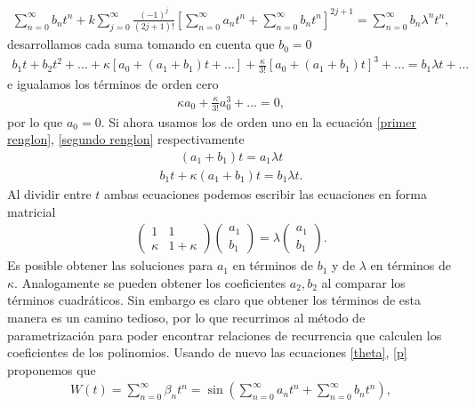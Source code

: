 \begin{eqnarray}
\sum_{n=0}^{\infty}b_{n}t^{n} +k\sum_{j=0}^{\infty}\frac{(-1)^{j}}{(2j+1)!}\left[ \sum_{n=0}^{\infty}a_{n}t^{n} +\sum_{n=0}^{\infty}b_{n}t^{n}\right]^{2j+1}=\sum_{n=0}^{\infty}b_{n}\lambda^{n}t^{n},
\label{seno exapandido 2}
\end{eqnarray}
desarrollamos cada suma tomando en cuenta que $b_{0}=0$
\begin{eqnarray}
b_{1}t+b_{2}t^{2}+...+\kappa\left[a_{0}+(a_{1}+b_{1})t+...\right]+\frac{\kappa}{3!}\left[a_{0}+(a_{1}+b_{1})t\right]^{3}+...=b_{1}\lambda t+...
\label{segundo renglon}
\end{eqnarray}
e igualamos los términos de orden cero
\begin{eqnarray}
\kappa a_{0}+\frac{\kappa}{3!}a_{0}^{3}+...=0, 
\end{eqnarray}
por lo que $a_{0}=0$. Si ahora usamos los de orden uno en la ecuación \ref{primer renglon}, \ref{segundo renglon} respectivamente
\begin{eqnarray}
(a_{1}+b_{1})t=a_{1}\lambda t
\end{eqnarray}
\begin{eqnarray}
b_{1}t+\kappa(a_{1}+b_{1})t=b_{1}\lambda t.
\end{eqnarray}
Al dividir entre $t$ ambas ecuaciones podemos escribir las ecuaciones en forma matricial
\begin{eqnarray}
\begin{pmatrix}
1 & 1\\
\kappa & 1+\kappa
\end{pmatrix}
\begin{pmatrix}
a_{1}\\
b_{1}
\end{pmatrix}=
\lambda \begin{pmatrix}
a_{1}\\
b_{1}
\end{pmatrix}.
\end{eqnarray}
Es posible obtener las soluciones para $a_{1}$ en términos de $b_{1}$ y de $\lambda$ en términos de $\kappa$. Analogamente se pueden obtener los coeficientes $a_{2},b_{2}$ al comparar los términos cuadráticos. Sin embargo es claro que obtener los términos de esta manera es un camino tedioso, por lo que recurrimos al método de parametrización para poder encontrar relaciones de recurrencia que calculen los coeficientes de los polinomios. Usando de nuevo las ecuaciones \ref{theta}, \ref{p} proponemos que 
\begin{eqnarray}
W(t)=\sum_{n=0}^{\infty}\beta_{n}t^{n}=\sin\left(\sum_{n=0}^{\infty}a_{n}t^{n}+\sum_{n=0}^{\infty}
b_{n}t^{n}\right),
\end{eqnarray} 
